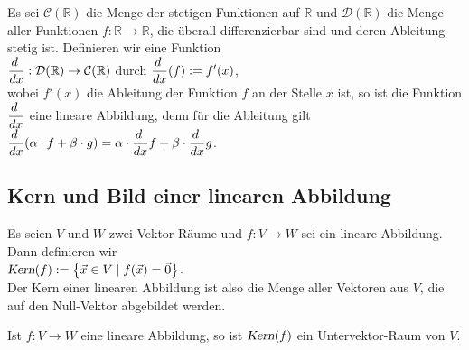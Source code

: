 \example
Es sei $\mathcal{C}(\mathbb{R})$ die Menge der stetigen Funktionen auf $\mathbb{R}$ und $\mathcal{D}(\mathbb{R})$ die Menge aller Funktionen
$f:\mathbb{R} \rightarrow \mathbb{R}$, die \"{u}berall differenzierbar sind und deren Ableitung stetig ist.  Definieren wir eine Funktion
\\[0.2cm]
\hspace*{1.3cm}
$\displaystyle\frac{d\;}{dx}: \mathcal{D}(\mathbb{R}) \rightarrow \mathcal{C}(\mathbb{R})$ \quad durch $\displaystyle\frac{d\;}{dx}(f) := f'(x)$,
\\[0.2cm]
wobei $f'(x)$ die Ableitung der Funktion $f$ an der Stelle $x$ ist, so ist die Funktion $\displaystyle\frac{d\;}{dx}$ eine lineare Abbildung,
denn f\"{u}r die Ableitung gilt
\\[0.2cm]
\hspace*{1.3cm}
$\displaystyle\frac{d\;}{dx} (\alpha \cdot f + \beta \cdot g) = \alpha \cdot \frac{d\;}{dx} f + \beta \cdot \frac{d\;}{dx} g$. \eoxs


\subsection{Kern und Bild einer linearen Abbildung}
\begin{Definition}[Kern]
  Es seien $V$ und $W$ zwei Vektor-R\"{a}ume und $f:V \rightarrow W$ sei ein lineare Abbildung.  Dann definieren wir 
  \\[0.2cm]
  \hspace*{1.3cm}
  $\textsl{Kern}(f) := \bigl\{ \vec{x} \in V \mid f(\vec{x}) = \vec{0} \bigr\}$.
  \\[0.2cm] 
  Der Kern einer linearen Abbildung ist also die Menge aller Vektoren aus $V$, die auf den Null-Vektor abgebildet werden.  \eoxs
\end{Definition}

\begin{Satz}
  Ist $f:V \rightarrow W$ eine lineare Abbildung, so ist $\textsl{Kern}(f)$ ein Untervektor-Raum von $V$.
\end{Satz}


